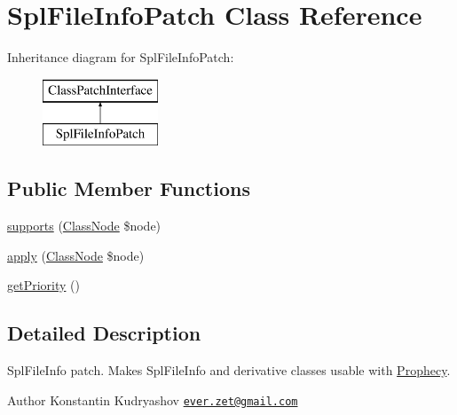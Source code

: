 \hypertarget{class_prophecy_1_1_doubler_1_1_class_patch_1_1_spl_file_info_patch}{}\section{Spl\+File\+Info\+Patch Class Reference}
\label{class_prophecy_1_1_doubler_1_1_class_patch_1_1_spl_file_info_patch}
Inheritance diagram for Spl\+File\+Info\+Patch\+:\begin{figure}[H]
\begin{center}
\leavevmode
\includegraphics[height=2.000000cm]{class_prophecy_1_1_doubler_1_1_class_patch_1_1_spl_file_info_patch}
\end{center}
\end{figure}
\subsection*{Public Member Functions}
\begin{DoxyCompactItemize}
\item 
\mbox{\hyperlink{class_prophecy_1_1_doubler_1_1_class_patch_1_1_spl_file_info_patch_a99b2455ac194faf79aff042c55719ac2}{supports}} (\mbox{\hyperlink{class_prophecy_1_1_doubler_1_1_generator_1_1_node_1_1_class_node}{Class\+Node}} \$node)
\item 
\mbox{\hyperlink{class_prophecy_1_1_doubler_1_1_class_patch_1_1_spl_file_info_patch_a62fdb697928f35fc782d6889b8fe9b8b}{apply}} (\mbox{\hyperlink{class_prophecy_1_1_doubler_1_1_generator_1_1_node_1_1_class_node}{Class\+Node}} \$node)
\item 
\mbox{\hyperlink{class_prophecy_1_1_doubler_1_1_class_patch_1_1_spl_file_info_patch_a1e7a3c168dcd0901a0d2669c67575b55}{get\+Priority}} ()
\end{DoxyCompactItemize}


\subsection{Detailed Description}
Spl\+File\+Info patch. Makes Spl\+File\+Info and derivative classes usable with \mbox{\hyperlink{namespace_prophecy_1_1_prophecy}{Prophecy}}.

\begin{DoxyAuthor}{Author}
Konstantin Kudryashov \href{mailto:ever.zet@gmail.com}{\tt ever.\+zet@gmail.\+com} 
\end{DoxyAuthor}


